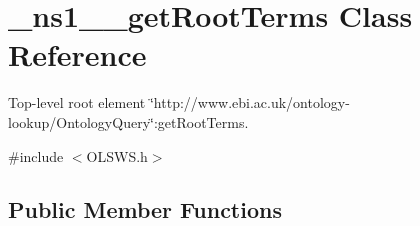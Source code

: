\hypertarget{class__ns1____getRootTerms}{
\section{\_\-ns1\_\-\_\-getRootTerms Class Reference}
\label{class__ns1____getRootTerms}
}


Top-\/level root element \char`\"{}http://www.ebi.ac.uk/ontology-\/lookup/OntologyQuery\char`\"{}:getRootTerms.  




{\ttfamily \#include $<$OLSWS.h$>$}

\subsection*{Public Member Functions}
